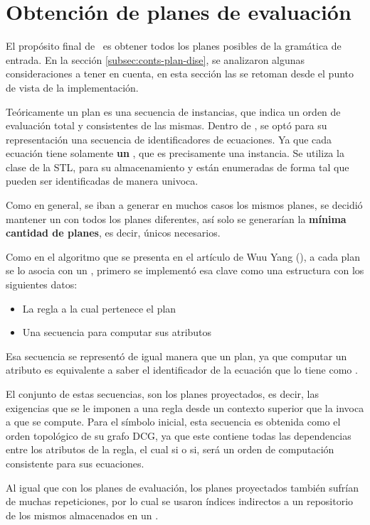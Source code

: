 \section{Obtención de planes de evaluación}
\label{sec:obtplaneval}

El propósito final de \maggen\ es obtener todos los planes posibles de la gramática de entrada. En la sección \ref{subsec:conts-plan-dise}, se analizaron algunas consideraciones a tener en cuenta, en esta sección las se retoman desde el punto de vista de la implementación. 

Teóricamente un plan es una secuencia de instancias, que indica un orden de evaluación total y consistentes de las mismas. Dentro de \maggen, se optó para su representación una secuencia de identificadores de ecuaciones. Ya que cada ecuación tiene solamente \textbf{un} , que es precisamente una instancia. Se utiliza la clase  de la STL, para su almacenamiento y están enumeradas de forma tal que pueden ser identificadas de manera univoca.

Como en general, se iban a generar en muchos casos los mismos planes, se decidió mantener un  con todos los planes diferentes, así solo se generarían la \textbf{mínima cantidad de planes}, es decir, únicos necesarios.

Como en el algoritmo que se presenta en el artículo de Wuu Yang (\cite{wuu-yang1}), a cada plan se lo asocia con un , primero se implementó esa clave como una estructura con los siguientes datos:
\begin{itemize}
\item La regla a la cual pertenece el plan
\item Una secuencia para computar sus atributos
\end{itemize}

Esa secuencia se representó de igual manera que un plan, ya que computar un atributo es equivalente a saber el identificador de la ecuación que lo tiene como .

El conjunto de estas secuencias, son los planes proyectados, es decir, las exigencias que se le imponen a una regla desde un contexto superior que la invoca a que se compute. Para el símbolo inicial, esta secuencia es obtenida como el orden topológico de su grafo DCG, ya que este contiene todas las dependencias entre los atributos de la regla, el cual si o si, será un orden de computación consistente para sus ecuaciones.

Al igual que con los planes de evaluación, los planes proyectados también sufrían de muchas repeticiones, por lo cual se usaron índices indirectos a un repositorio de los mismos almacenados en un .

